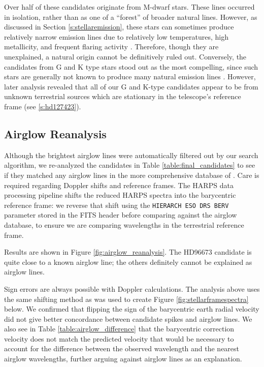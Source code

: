 \documentclass[linenumbers]{aastex631}
\begin{document}
Over half of these candidates originate from M-dwarf stars. These lines occurred in isolation, rather than as one of a ``forest'' of broader natural lines. However, as discussed in Section \ref{s:stellaremission}, these stars can sometimes produce relatively narrow emission lines due to relatively low temperatures, high metallicity, and frequent flaring activity \citep{Marcy_2021}. Therefore, though they are unexplained, a natural origin cannot be definitively ruled out. Conversely, the candidates from G and K type stars stood out as the most compelling, since such stars are generally not known to produce many natural emission lines \citep{stellar_emission_linesJ}. However, later analysis revealed that all of our G and K-type candidates appear to be from unknown terrestrial sources which are stationary in the telescope's reference frame (see \ref{s:hd127423}).


\subsection{Airglow Reanalysis}
\label{s:airglow_reanalysis}

Although the brightest airglow lines were automatically filtered out by our search algorithm, we re-analyzed the candidates in Table \ref{table:final_candidates} to see if they matched any airglow lines in the more comprehensive database of \cite{faint_airglow_database}.  Care is required regarding Doppler shifts and reference frames. The HARPS data processing pipeline shifts the reduced HARPS spectra into the barycentric reference frame: we reverse that shift using the \texttt{HIERARCH ESO DRS BERV} parameter stored in the FITS header before comparing against the airglow database, to ensure we are comparing wavelengths in the terrestrial reference frame.

Results are shown in Figure \ref{fig:airglow_reanalysis}. The HD96673 candidate is quite close to a known airglow line; the others definitely cannot be explained as airglow lines.

Sign errors are always possible with Doppler calculations.  The analysis above uses the same shifting method as was used to create Figure \ref{fig:stellarframespectra} below.  We confirmed that flipping the sign of the barycentric earth radial velocity did not give better concordance between candidate spikes and airglow lines. We also see in Table \ref{table:airglow_difference} that the barycentric correction velocity does not match the predicted velocity that would be necessary to account for the difference between the observed wavelength and the nearest airglow wavelengths, further arguing against airglow lines as an explanation.
\end{document}
